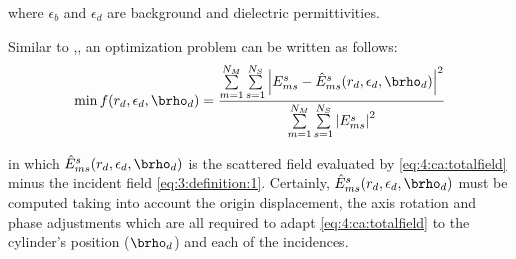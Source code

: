 			\noindent where $\epsilon_b$ and $\epsilon_d$ are background and dielectric permittivities.
			
			Similar to \citep{michalski2000electromagnetic},, an optimization problem can be written as follows:
			\begin{equation}
				\min f(r_d,\epsilon_d,\brho_d) = \frac{\sum\limits_{m=1}^{N_M}\sum\limits_{s=1}^{N_S}\left|E^s_{ms}- \hat{E}^s_{ms}(r_d,\epsilon_d,\brho_d)\right|^2}{\sum\limits_{m=1}^{N_M}\sum\limits_{s=1}^{N_S}\left|E^s_{ms}\right|^2} \label{eq:4:ca:objfun}
			\end{equation}
		
			\noindent in which $\hat{E}^s_{ms}(r_d,\epsilon_d,\brho_d)$ is the scattered field evaluated by \eqref{eq:4:ca:totalfield} minus the incident field \eqref{eq:3:definition:1}. Certainly, $\hat{E}^s_{ms}(r_d,\epsilon_d,\brho_d)$ must be computed taking into account the origin displacement, the axis rotation and phase adjustments which are all required to adapt \eqref{eq:4:ca:totalfield} to the cylinder's position ($\brho_d$) and each of the incidences.
			

